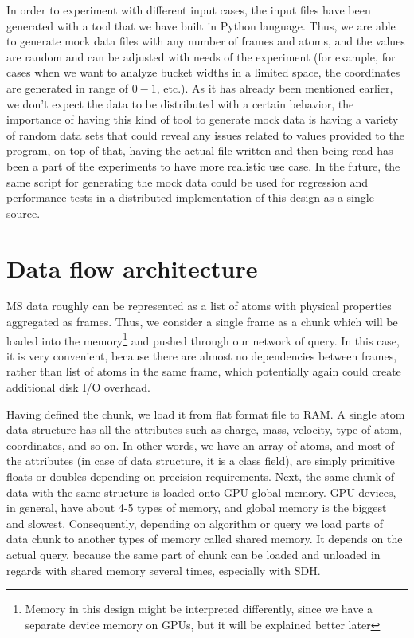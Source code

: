 \documentclass[11pt,a4paper]{report}
\begin{document}
In order to experiment with different input cases, the input files have been generated with a tool that we have built in Python language. Thus, we are able to generate mock data files with any number of frames and atoms, and the values are random and can be adjusted with needs of the experiment (for example, for cases when we want to analyze bucket widths in a limited space, the coordinates are generated in range of $0 - 1$, etc.). As it has already been mentioned earlier, we don't expect the data to be distributed with a certain behavior, the importance of having this kind of tool to generate mock data is having a variety of random data sets that could reveal any issues related to values provided to the program, on top of that, having the actual file written and then being read has been a part of the experiments to have more realistic use case. In the future, the same script for generating the mock data could be used for regression and performance tests in a distributed implementation of this design as a single source.

\section{Data flow architecture}

MS data roughly can be represented as a list of atoms with physical properties aggregated as frames. Thus, we consider a single frame as a chunk which will be loaded into the memory\footnote{Memory in this design might be interpreted differently, since we have a separate device memory on GPUs, but it will be explained better later} and pushed through our network of query. In this case, it is very convenient, because there are almost no dependencies between frames, rather than list of atoms in the same frame, which potentially again could create additional disk I/O overhead.

Having defined the chunk, we load it from flat format file to RAM. A single atom data structure has all the attributes such as charge, mass, velocity, type of atom, coordinates, and so on. In other words, we have an array of atoms, and most of the attributes (in case of data structure, it is a class field), are simply primitive floats or doubles depending on precision requirements. Next, the same chunk of data with the same structure is loaded onto GPU global memory. GPU devices, in general, have about 4-5 types of memory, and global memory is the biggest and slowest. Consequently, depending on algorithm or query we load parts of data chunk to another types of memory called shared memory. It depends on the actual query, because the same part of chunk can be loaded and unloaded in regards with shared memory several times, especially with SDH.
\end{document}
